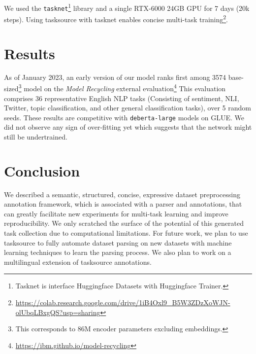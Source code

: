 \documentclass[11pt]{article}
\begin{document}
We used the \texttt{tasknet}\footnote{Tasknet \citep{sileod22-tasknet} is 
 interface Huggingface Datasets with Huggingface Trainer.} library and a single RTX-6000 24GB GPU for 7 days (20k steps).
Using tasksource with tasknet enables concise multi-task training\footnote{\url{https://colab.research.google.com/drive/1iB4Oxl9_B5W3ZDzXoWJN-olUbqLBxgQS?usp=sharing}}.
\section{Results \label{sec:results}}

As of January 2023, an early version of our model ranks first among 3574 base-sized\footnote{This corresponds to 86M encoder parameters excluding embeddings.} model on  the \textit{Model Recycling} \citep{choshen2022start} external evaluation\footnote{\url{https://ibm.github.io/model-recycling}}
This evaluation comprises 36 representative English NLP tasks (Consisting of sentiment, NLI, Twitter, topic classification, and other general classification tasks), over 5 random seeds. These results are competitive with \texttt{deberta-large} models on GLUE. We did not observe any sign of over-fitting  yet which suggests that the network might still be undertrained.

\section{Conclusion}

We described a semantic, structured, concise, expressive dataset preprocessing annotation framework, which is associated with a parser and annotations, that can greatly facilitate new experiments for multi-task learning and improve reproducibility. We only scratched the surface of the potential of this generated task collection due to computational limitations. For future work, we plan to use tasksource to fully automate dataset parsing on new datasets with machine learning techniques to learn the parsing process. We also plan to work on a multilingual extension of tasksource annotations.



\onecolumn
\appendix
\end{document}

